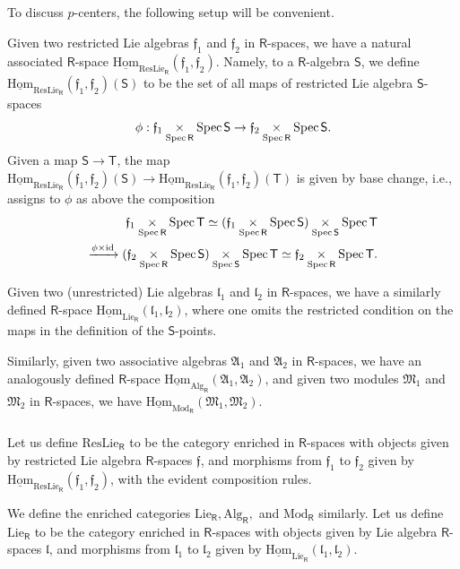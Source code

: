 \documentclass{amsart}
\theoremstyle{definition}
\newcommand{\fl}{\mathfrak{l}}
\newcommand{\uHom}{\underline{\on{Hom}}}
\newcommand{\sss}{\subsubsection{}}
\newcommand{\Spec}{\on{Spec}\hspace{.5mm}}
\newcommand{\Sing}{\mathsf{S}}
\newcommand{\Ting}{\mathsf{T}}
\newcommand{\on}{\mathrm}
\newcommand{\Ring}{\mathsf{R}}
\newcommand{\ff}{\mathfrak{f}}
\numberwithin{equation}{section}
\begin{document}
\sss\label{SSS:p_center} To discuss $p$-centers, the following setup will be convenient. 

Given two restricted Lie algebras $\ff_1$ and $\ff_2$ in $\Ring$-spaces, we have a natural associated $\Ring$-space $\uHom_{\on{ResLie}_\Ring}(\ff_1, \ff_2)$. Namely, to a $\Ring$-algebra $\Sing$, we define $\uHom_{\on{ResLie}_\Ring}(\ff_1, \ff_2)(\Sing)$ to be the set of all maps of restricted Lie algebra $\Sing$-spaces $$\phi: \ff_1 \underset{\Spec \Ring} \times \Spec \Sing \rightarrow \ff_2 \underset{\Spec \Ring} \times \Spec \Sing.$$ 
Given a map $\Sing \rightarrow \Ting$, the map $\uHom_{\on{ResLie}_\Ring}(\ff_1, \ff_2)(\Sing) \rightarrow \uHom_{\on{ResLie}_\Ring}(\ff_1, \ff_2)(\Ting)$ is given by base change, i.e., assigns to $\phi$ as above the composition \begin{align*}\ff_1 \underset{\Spec \Ring} \times \Spec \Ting \simeq  (\ff_1 \underset{\Spec \Ring} \times \Spec \Sing) \underset{\Spec \Sing} \times \Spec \Ting \\ \xrightarrow{\phi \times \on{id}}  (\ff_2 \underset{\Spec \Ring} \times \Spec \Sing) \underset{\Spec \Sing} \times \Spec \Ting \simeq \ff_2 \underset{\Spec \Ring} \times \Spec \Ting.\end{align*}

Given two (unrestricted) Lie algebras $\fl_1$ and $\fl_2$ in $\Ring$-spaces, we have a similarly defined $\Ring$-space $\uHom_{\on{Lie}_\Ring}(\fl_1, \fl_2)$, where one omits the restricted condition on the maps in the definition of the $\Sing$-points. 

Similarly, given two associative algebras $\mathfrak{A}_1$ and $\mathfrak{A}_2$ in $\Ring$-spaces, we have an analogously defined $\Ring$-space $\uHom_{\on{Alg}_\Ring}(\mathfrak{A}_1, \mathfrak{A}_2)$, and given two modules $\mathfrak{M}_1$ and $\mathfrak{M}_2$ in $\Ring$-spaces, we have $\uHom_{\on{Mod}_\Ring}(\mathfrak{M}_1, \mathfrak{M}_2)$. 


\sss Let us define $\on{ResLie}_{\Ring}$ to be the category enriched in $\Ring$-spaces with objects given by restricted Lie algebra $\Ring$-spaces $\ff$, and morphisms from $\ff_1$ to $\ff_2$ given by $\uHom_{\on{ResLie}_{\Ring}}(\ff_1, \ff_2)$, with the evident composition rules. 

We define the enriched categories $\on{Lie}_\Ring, \on{Alg}_\Ring,$ and $\on{Mod}_\Ring$ similarly. 
\iffalse 
Let us define $\on{Lie}_\Ring$ to be the category enriched in $\Ring$-spaces with objects given by Lie algebra $\Ring$-spaces $\mathfrak{\fl}$, and morphisms from $\fl_1$ to $\fl_2$ given by $\uHom_{\on{Lie}_\Ring}(\fl_1, \fl_2)$. 
\end{document}
